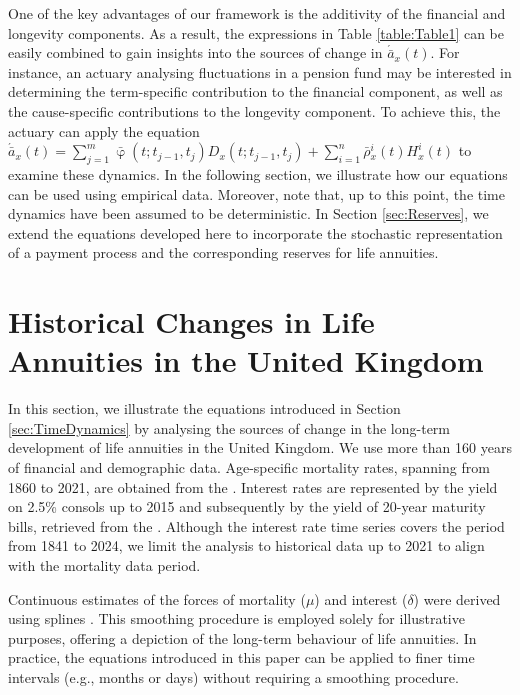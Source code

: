 \documentclass[12pt]{article}
\begin{document}
One of the key advantages of our framework is the additivity of the financial and longevity components. As a result, the expressions in Table \ref{table:Table1} can be easily combined to gain insights into the sources of change in $\acute{\bar{a}}_x(t)$. For instance, an actuary analysing fluctuations in a pension fund may be interested in determining the term-specific contribution to the financial component, as well as the cause-specific contributions to the longevity component. To achieve this, the actuary can apply the equation 
$\acute{\bar{a}}_x(t)=\sum_{j=1}^m\bar{\upvarphi}(t;t_{j-1},t_{j}){D}_x(t;t_{j-1},t_{j})+\sum_{i=1}^{n} \bar{\rho}{^i_x}(t){H}^{i}_x(t)$ to examine these dynamics. In the following section, we illustrate how our equations can be used using empirical data. Moreover, note that, up to this point, the time dynamics have been assumed to be deterministic. In Section \ref{sec:Reserves}, we extend the equations developed here to incorporate the stochastic representation of a payment process and the corresponding reserves for life annuities. 



\section{Historical Changes in Life Annuities in the United Kingdom}\label{sec:UK_Illustration}

In this section, we illustrate the equations introduced in Section \ref{sec:TimeDynamics} by analysing the sources of change in the long-term development of life annuities in the United Kingdom. We use more than 160 years of financial and demographic data. Age-specific mortality rates, spanning from 1860 to 2021, are obtained from the \citet{HMD2024}. Interest rates are represented by the yield on 2.5\% consols up to 2015 and subsequently by the yield of 20-year maturity bills, retrieved from the \citet{BankOfEngland2024}. Although the interest rate time series covers the period from 1841 to 2024, we limit the analysis to historical data up to 2021 to align with the mortality data period.

Continuous estimates of the forces of mortality (\(\mu\)) and interest (\(\delta\)) were derived using splines \citep{green1993nonparametric,camarda2012mortalitysmooth}. This smoothing procedure is employed solely for illustrative purposes, offering a depiction of the long-term behaviour of life annuities. In practice, the equations introduced in this paper can be applied to finer time intervals (e.g., months or days) without requiring a smoothing procedure.
\end{document}
